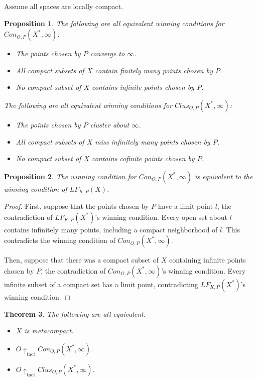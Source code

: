 \documentclass[11pt]{article}
\theoremstyle{plain}
\newtheorem{theorem}{Theorem}
\newtheorem{proposition}[theorem]{Proposition}
\theoremstyle{definition}
\theoremstyle{remark}
\newcommand{\tactwin}{\uparrow_{\text{tact}}}
\newcommand{\oneptcomp}[1]{#1^*}
\newcommand{\congame}[2]{Con_{O,P}(#1,#2)}
\newcommand{\clusgame}[2]{Clus_{O,P}(#1,#2)}
\newcommand{\lfkpgame}[1]{LF_{K,P}(#1)}
\newcommand{\<}{\langle}
\renewcommand{\>}{\rangle}
\begin{document}
Assume all spaces are locally compact.

\begin{proposition}
The following are all equivalent winning conditions for $\congame{\oneptcomp{X}}{\infty}$:
\begin{itemize}
\item The points chosen by $P$ converge to $\infty$.
\item All compact subsets of $X$ contain finitely many points chosen by $P$.
\item No compact subset of $X$ contains infinite points chosen by $P$.
\end{itemize}

The following are all equivalent winning conditions for $\clusgame{\oneptcomp{X}}{\infty}$:
\begin{itemize}
\item The points chosen by $P$ cluster about $\infty$.
\item All compact subsets of $X$ miss infinitely many points chosen by $P$.
\item No compact subset of $X$ contains cofinite points chosen by $P$.
\end{itemize}
\end{proposition}

\begin{proposition}
The winning condition for $\congame{\oneptcomp{X}}{\infty}$ is equivalent to the winning condition of $\lfkpgame{X}$.
\end{proposition}

\begin{proof}
First, suppose that the points chosen by $P$ have a limit point $l$, the contradiction of $\lfkpgame{\oneptcomp{X}}$'s winning condition. Every open set about $l$ contains infinitely many points, including a compact neighborhood of $l$. This contradicts the winning condition of $\congame{\oneptcomp{X}}{\infty}$.

Then, suppose that there was a compact subset of $X$ containing infinite points chosen by $P$, the contradiction of $\congame{\oneptcomp{X}}{\infty}$'s winning condition. Every infinite subset of a compact set has a limit point, contradicting $\lfkpgame{\oneptcomp{X}}$'s winning condition.
\end{proof}

\begin{theorem}
The following are all equivalent.
\begin{itemize}
\item $X$ is metacompact.
\item $O\tactwin\congame{\oneptcomp{X}}{\infty}$.
\item $O\tactwin\clusgame{\oneptcomp{X}}{\infty}$.
\end{itemize}
\end{theorem}
\end{document}
